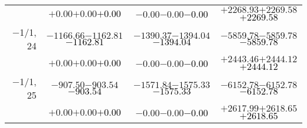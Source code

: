 \documentclass[compress]{beamer}
\begin{document}
\begin{frame}
{\begin{tabular}{r | c | c | c}
           & $+0.00$\hspace{0.1 cm}$+0.00$\hspace{0.1 cm}\textcolor{black}{$+0.00$} & $-0.00$\hspace{0.1 cm}$-0.00$\hspace{0.1 cm}\textcolor{black}{$-0.00$} & $+2268.93$\hspace{0.1 cm}$+2269.58$\hspace{0.1 cm}\textcolor{black}{$+2269.58$} \\
$-$1/1, 24 & $-1166.66$\hspace{0.1 cm}$-1162.81$\hspace{0.1 cm}\textcolor{black}{$-1162.81$} & $-1390.37$\hspace{0.1 cm}$-1394.04$\hspace{0.1 cm}\textcolor{black}{$-1394.04$} & $-5859.78$\hspace{0.1 cm}$-5859.78$\hspace{0.1 cm}\textcolor{black}{$-5859.78$} \\
           & $+0.00$\hspace{0.1 cm}$+0.00$\hspace{0.1 cm}\textcolor{black}{$+0.00$} & $-0.00$\hspace{0.1 cm}$-0.00$\hspace{0.1 cm}\textcolor{black}{$-0.00$} & $+2443.46$\hspace{0.1 cm}$+2444.12$\hspace{0.1 cm}\textcolor{black}{$+2444.12$} \\
$-$1/1, 25 & $-907.50$\hspace{0.1 cm}$-903.54$\hspace{0.1 cm}\textcolor{black}{$-903.54$} & $-1571.84$\hspace{0.1 cm}$-1575.33$\hspace{0.1 cm}\textcolor{black}{$-1575.33$} & $-6152.78$\hspace{0.1 cm}$-6152.78$\hspace{0.1 cm}\textcolor{black}{$-6152.78$} \\
           & $+0.00$\hspace{0.1 cm}$+0.00$\hspace{0.1 cm}\textcolor{black}{$+0.00$} & $-0.00$\hspace{0.1 cm}$-0.00$\hspace{0.1 cm}\textcolor{black}{$-0.00$} & $+2617.99$\hspace{0.1 cm}$+2618.65$\hspace{0.1 cm}\textcolor{black}{$+2618.65$} \\

\end{tabular}}
\end{frame}
\end{document}
